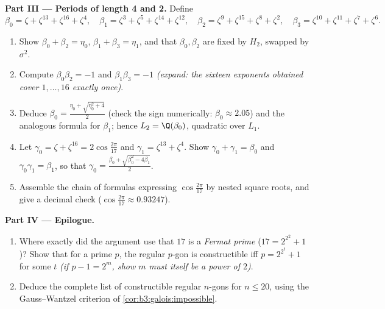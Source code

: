 \begin{problem}
\medskip
\noindent\textbf{Part III --- Periods of length 4 and 2.}
Define
\[
\beta_0 = \zeta + \zeta^{13} + \zeta^{16} + \zeta^{4},\quad
\beta_1 = \zeta^3 + \zeta^5 + \zeta^{14} + \zeta^{12},\quad
\beta_2 = \zeta^9 + \zeta^{15} + \zeta^{8} + \zeta^{2},\quad
\beta_3 = \zeta^{10} + \zeta^{11} + \zeta^{7} + \zeta^{6}.
\]
\begin{enumerate}[resume]
  \item Show $\beta_0 + \beta_2 = \eta_0$, $\beta_1 + \beta_3 =
        \eta_1$, and that $\beta_0, \beta_2$ are fixed by $H_2$,
        swapped by $\sigma^2$.
  \item Compute $\beta_0\beta_2 = -1$ and $\beta_1\beta_3 = -1$
        \emph{(expand: the sixteen exponents obtained cover
        $1, \dots, 16$ exactly once)}.
  \item Deduce $\beta_0 = \frac{\eta_0 + \sqrt{\eta_0^2 + 4}}2$
        (check the sign numerically: $\beta_0 \approx 2.05$) and
        the analogous formula for $\beta_1$; hence $L_2 =
        \Q(\beta_0)$, quadratic over $L_1$.
  \item Let $\gamma_0 = \zeta + \zeta^{16} =
        2\cos\frac{2\pi}{17}$ and $\gamma_1 = \zeta^{13} +
        \zeta^4$. Show $\gamma_0 + \gamma_1 = \beta_0$ and
        $\gamma_0\gamma_1 = \beta_1$, so that $\gamma_0 =
        \frac{\beta_0 + \sqrt{\beta_0^2 - 4\beta_1}}2$.
  \item Assemble the chain of formulas expressing
        $\cos\frac{2\pi}{17}$ by nested square roots, and give a
        decimal check ($\cos\frac{2\pi}{17} \approx 0.93247$).
\end{enumerate}

\medskip
\noindent\textbf{Part IV --- Epilogue.}
\begin{enumerate}[resume]
  \item Where exactly did the argument use that $17$ is a
        \emph{Fermat prime} ($17 = 2^{2^2} + 1$)? Show that for
        a prime $p$, the regular $p$-gon is constructible iff $p
        = 2^{2^t} + 1$ for some $t$ \emph{(if $p - 1 = 2^m$,
        show $m$ must itself be a power of $2$)}.
  \item Deduce the complete list of constructible regular
        $n$-gons for $n \leq 20$, using the Gauss--Wantzel
        criterion of \cref{cor:b3:galois:impossible}.
\end{enumerate}


\end{problem}
